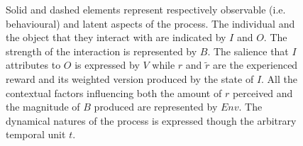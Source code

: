 \begin{figure}[h]
\begin{center}
\begin{adjustbox}{width=0.5\columnwidth}
    \end{adjustbox}
  \end{center}
\caption[\textbf{The process of incentive salience attribution}]{Solid and dashed elements represent respectively observable (i.e. behavioural) and latent aspects of the process. The individual and the object that they interact with are indicated by $I$ and $O$. The strength of the interaction is represented by $B$. The salience that $I$ attributes to $O$ is expressed by $V$ while $r$ and $\tilde{r}$ are the experienced reward and its weighted version produced by the state of $I$. All the contextual factors influencing both the amount of $r$ perceived and the magnitude of $B$ produced are represented by $Env$. The dynamical natures of the process is expressed though the arbitrary temporal unit $t$.}
\label{fig: incs}
\end{figure}